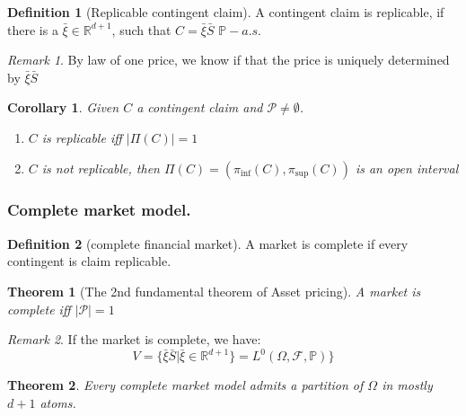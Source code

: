 \documentclass[a4paper,11pt]{book}
\newtheorem{theorem}{Theorem}[section]
\newtheorem{corollary}{Corollary}[theorem]
\theoremstyle{definition}
\newtheorem{definition}{Definition}[section]
\theoremstyle{remark}
\newtheorem*{remark}{Remark}
\begin{document}
\begin{definition}[Replicable contingent claim]
A contingent claim is replicable, if there is a $\bar{\xi} \in \mathbb{R}^{d+1}$, such that $C = \bar{\xi} \bar{S}$ $\mathbb{P}-a.s.$
\end{definition}
\begin{remark}
By law of one price, we know if that the price is uniquely determined by $\bar{\xi} \bar{S}$	
\end{remark}

\begin{corollary}
	Given $C$ a contingent claim and $\mathcal{P} \neq \emptyset$.
	\begin{enumerate}
		\item $C$ is replicable iff $|\Pi(C)| = 1$
		\item $C$ is not replicable, then $\Pi(C) = (\pi_{\inf}(C), \pi_{\sup}(C))$ is an open interval
	\end{enumerate}
\end{corollary}




\subsubsection{Complete market model.}

\begin{definition}[complete financial market]
A market is complete if every contingent is claim replicable. 
\end{definition}

\begin{theorem}[The 2nd fundamental theorem of Asset pricing]
	A market is complete iff $|\mathcal{P}| = 1$
\end{theorem}
\begin{remark}
If the market is complete, we have:
\begin{equation*}
	V = \{\bar{\xi}\bar{S}|\bar{\xi} \in \mathbb{R}^{d+1}\} = L^0(\Omega, \mathcal{F}, \mathbb{P})\}
\end{equation*}	
\end{remark}

\begin{theorem}
	Every complete market model admits a partition of $\Omega$ in mostly $d+1$ atoms.
\end{theorem}
\end{document}
